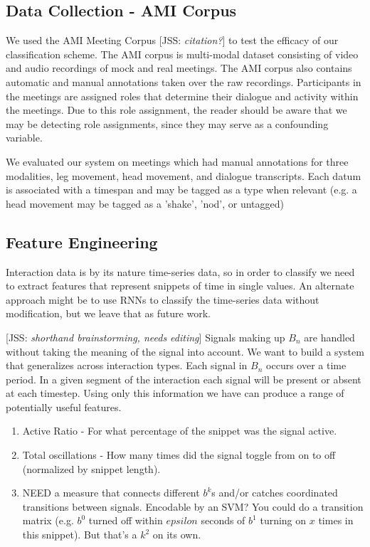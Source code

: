 \documentclass[conference]{IEEEtran}
\newcommand{\meta}[1]{{\textcolor[rgb]{0.1,0.7,0.2}{[JSS: {\it #1}]}}}
\begin{document}
\subsection{Data Collection - AMI Corpus}

We used the AMI Meeting Corpus \meta{citation?} to test the efficacy of our classification scheme. The AMI corpus is multi-modal dataset consisting of video and audio recordings of mock and real meetings. The AMI corpus also contains automatic and manual annotations taken over the raw recordings. Participants in the meetings are assigned roles that determine their dialogue and activity within the meetings. Due to this role assignment, the reader should be aware that we may be detecting role assignments, since they may serve as a confounding variable. 

We evaluated our system on meetings which had manual annotations for three modalities, leg movement, head movement, and dialogue transcripts. Each datum is associated with a timespan and may be tagged as a type when relevant (e.g. a head movement may be tagged as a 'shake', 'nod', or untagged)

\subsection{Feature Engineering}

Interaction data is by its nature time-series data, so in order to classify we need to extract features that represent snippets of time in single values. An alternate approach might be to use RNNs to classify the time-series data without modification, but we leave that as future work. 

\meta{shorthand brainstorming, needs editing}
Signals making up $B_n$ are handled without taking the meaning of the signal into account. We want to build a system that generalizes across interaction types. Each signal in $B_n$ occurs over a time period. In a given segment of the interaction each signal will be present or absent at each timestep. Using only this information we have can produce a range of potentially useful features.

\begin{enumerate}
    \item Active Ratio - For what percentage of the snippet was the signal active.
    \item Total oscillations - How many times did the signal toggle from on to off (normalized by snippet length). 
    \item NEED a measure that connects different $b^k$s and/or catches coordinated transitions between signals. Encodable by an SVM? You could do a transition matrix (e.g. $b^0$ turned off within $epsilon$ seconds of $b^1$ turning on $x$ times in this snippet). But that's a $k^2$ on its own.
\end{enumerate}
\end{document}
